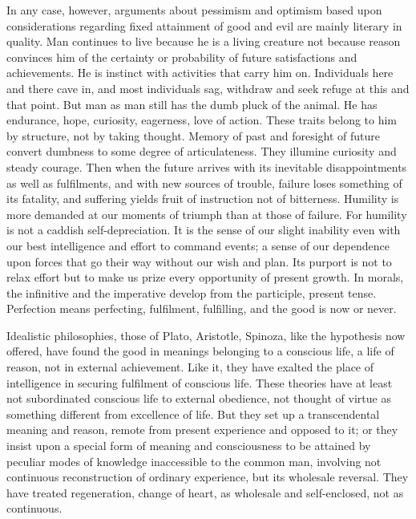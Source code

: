 \documentclass[12pt]{article}
\begin{document}
In any case, however, arguments about pessimism and
optimism based upon considerations regarding fixed
attainment of good and evil are mainly literary in quality.
Man continues to live because he is a living creature
not because reason convinces him of the certainty
or probability of future satisfactions and achievements.
He is instinct with activities that carry him on. Individuals
here and there cave in, and most individuals
sag, withdraw and seek refuge at this and that point.
But man as man still has the dumb pluck of the animal.
He has endurance, hope, curiosity, eagerness, love of
action. These traits belong to him by structure, not by
taking thought. Memory of past and foresight of future
convert dumbness to some degree of articulateness.
They illumine curiosity and steady courage.
Then when the future arrives with its inevitable disappointments
as well as fulfilments, and with new
sources of trouble, failure loses something of its fatality,
and suffering yields fruit of instruction not of bitterness.
Humility is more demanded at our moments
of triumph than at those of failure. For humility is
not a caddish self-depreciation. It is the sense of our
slight inability even with our best intelligence and effort
to command events; a sense of our dependence
upon forces that go their way without our wish and
plan. Its purport is not to relax effort but to make
us prize every opportunity of present growth. In
morals, the infinitive and the imperative develop from
the participle, present tense. Perfection means perfecting,
fulfilment, fulfilling, and the good is now or
never.

Idealistic philosophies, those of Plato, Aristotle, Spinoza,
like the hypothesis now offered, have found the
good in meanings belonging to a conscious life, a life
of reason, not in external achievement. Like it, they
have exalted the place of intelligence in securing fulfilment
of conscious life. These theories have at least
not subordinated conscious life to external obedience,
not thought of virtue as something different from excellence
of life. But they set up a transcendental meaning
and reason, remote from present experience and
opposed to it; or they insist upon a special form of
meaning and consciousness to be attained by peculiar
modes of knowledge inaccessible to the common man,
involving not continuous reconstruction of ordinary
experience, but its wholesale reversal. They have
treated regeneration, change of heart, as wholesale and
self-enclosed, not as continuous.
\end{document}
